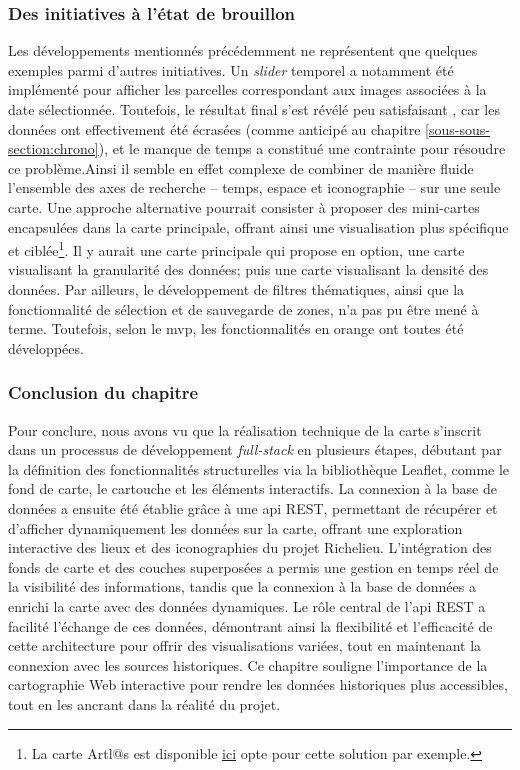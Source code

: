 \subsubsection{Des initiatives à l'état de brouillon}
Les développements mentionnés précédemment ne représentent que quelques exemples parmi d'autres initiatives. Un \textit{slider} temporel a notamment été implémenté pour afficher les parcelles correspondant aux images associées à la date sélectionnée. Toutefois, le résultat final s'est révélé peu satisfaisant , car les données ont effectivement été écrasées (comme anticipé au chapitre \ref{sous-sous-section:chrono}), et le manque de temps a constitué une contrainte pour résoudre ce problème.Ainsi il semble en effet complexe de combiner de manière fluide l'ensemble des axes de recherche – temps, espace et iconographie – sur une seule carte. Une approche alternative pourrait consister à proposer des mini-cartes encapsulées dans la carte principale, offrant ainsi une visualisation plus spécifique et ciblée\footnote{La carte Artl@s est disponible \href{https://paris-art-market.huma-num.fr/}{ici} opte pour cette solution par exemple.}. Il y aurait une carte principale qui propose en option, une carte visualisant la granularité des données; puis une carte visualisant la densité des données. Par ailleurs, le développement de filtres thématiques, ainsi que la fonctionnalité de sélection et de sauvegarde de zones, n'a pas pu être mené à terme. Toutefois, selon le \acrshort{mvp}, les fonctionnalités en orange ont toutes été développées. 

\subsubsection{Conclusion du chapitre}
Pour conclure, nous avons vu que la réalisation technique de la carte s'inscrit dans un processus de développement  \textit{full-stack} en plusieurs étapes, débutant par la définition des fonctionnalités structurelles via la bibliothèque Leaflet, comme le fond de carte, le cartouche et les éléments interactifs. La connexion à la base de données a ensuite été établie grâce à une \acrshort{api} REST, permettant de récupérer et d'afficher dynamiquement les données sur la carte, offrant une exploration interactive des lieux et des iconographies du projet Richelieu. L'intégration des fonds de carte et des couches superposées a permis une gestion en temps réel de la visibilité des informations, tandis que la connexion à la base de données a enrichi la carte avec des données dynamiques. Le rôle central de l'\acrshort{api} REST a facilité l'échange de ces données, démontrant ainsi la flexibilité et l'efficacité de cette architecture pour offrir des visualisations variées, tout en maintenant la connexion avec les sources historiques. Ce chapitre souligne l'importance de la cartographie Web interactive pour rendre les données historiques plus accessibles, tout en les ancrant dans la réalité du projet.

